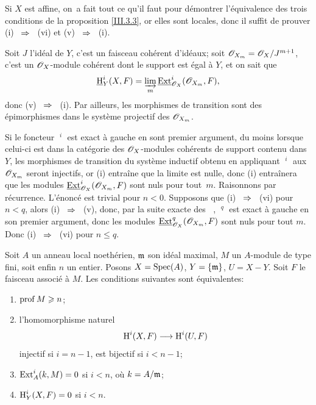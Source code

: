 Si $X$ est affine, on~a fait tout ce qu'il faut \ignorespaces pour d\'emontrer l'\'equivalence des trois conditions de la proposition \ref{III.3.3},  or elles sont locales, donc il suffit de prouver (i) ~$\To$~ (vi) et (v) ~$\To$~ (i).

Soit $J$ l'id\'eal de $Y$, c'est un faisceau coh\'erent d'id\'eaux; soit ${\mathscr O}_{X_m} = \mathscr{O}_X/J^{m+1}$, c'est un $\mathscr{O}_X$-module coh\'erent dont le support est \'egal \`a $Y$, et on sait \ignorespaces que
\[
\mathop{\underline{\mathrm{H}}}\nolimits_Y^i(X, F) = \varinjlim_m \mathop{\underline{\mathrm{Ext}}}\nolimits_{\mathscr{O}_X}^i({\mathscr O}_{X_m}, F),
\]
donc (v) ~$\To$~ (i). Par ailleurs, les morphismes de transition sont des \'epimorphismes dans le syst\`eme projectif des ${\mathscr O}_{X_m}$.

Si le foncteur $\mathop{\underline{\mathrm{Ext}}}\nolimits^i$ est exact \`a gauche en sont premier argument, du moins lorsque celui-ci est dans la cat\'egorie des $\mathscr{O}_X$-modules coh\'erents de support contenu dans $Y$, les morphismes de transition du syst\`eme inductif obtenu en appliquant $\mathop{\underline{\mathrm{Ext}}}\nolimits^i$ aux ${\mathscr O}_{X_m}$ seront injectifs, or (i) entra\^ine que la limite est nulle, donc (i) entra\^inera que les modules $\mathop{\underline{\mathrm{Ext}}}\nolimits_{\mathscr{O}_X}^i({\mathscr O}_{X_m}, F)$ sont nuls pour tout~$m$. Raisonnons par r\'ecurrence. L'\'enonc\'e est trivial pour $n<0$. Supposons que (i) ~$\To$~ (vi) pour $n<q$, alors (i) ~$\To$~ (v), donc, par la suite exacte des $\mathop{\underline{\mathrm{Ext}}}\nolimits$, $\mathop{\underline{\mathrm{Ext}}}\nolimits^q$ est exact \`a gauche en son premier argument, donc les modules $\mathop{\underline{\mathrm{Ext}}}\nolimits_{\mathscr{O}_X}^q({\mathscr O}_{X_m}, F)$ sont nuls pour tout $m$. Donc (i) ~$\To$~ (vi) pour $n\leq q$.
\CQFD

\bgroup
\def\labelenumi{\theenumi)}
\begin{exemple} \label{III.3.4}
Soit $A$ un anneau local noeth\'erien, $\mathfrak{m}$ son id\'eal maximal, $M$ un $A$-module de type fini, soit enfin $n$ un entier. Posons $X=\operatorname{Spec} (A)$, $Y=\{\mathfrak{m}\}$, $U=X-Y$. Soit $F$ le faisceau associ\'e \`a $M$. Les conditions suivantes sont \'equivalentes:
\begin{enumerate}

\item
$\operatorname{prof} M \geqslant n$;

\item
l'homomorphisme naturel
\[
\H^i(X, F) \to \H^i(U, F)
\]
 injectif si $i=n-1$, est bijectif si $i<n-1$;

\item
$\operatorname{Ext}_A^i(k, M) =0$ si $i<n$, o\`u $k=A/\mathfrak{m}$;

\item
$\operatorname{H}_Y^i(X, F)=0$ si $i<n$.
\end{enumerate}
\end{exemple}



